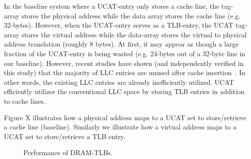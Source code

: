 In the baseline system where a UCAT-entry only stores a cache line,
the tag-array stores the physical address while the data array stores
the cache line (e.g. 32-bytes). However, when the UCAT-entry serves as
a TLB-entry, the UCAT tag-array stores the virtual address while the
data-array stores the virtual to physical address translation (roughly
8 bytes). At first, it may appear as though a large fraction of the
UCAT-entry is being wasted (e.g. 24-bytes out of a 32-byte line in our
baseline). However, recent studies have shown (and independently
verified in this study) that the majority of LLC entries are unused
after cache insertion~\cite{}. In other words, the existing LLC
entries are already inefficiently utilized. UCAT efficiently utilizes
the conventional LLC space by storing TLB entries in addition to cache
lines.

Figure X illustrates how a physical address maps to a UCAT set to
store/retrieve a cache line (baseline). Similarly we illustrate how a
virtual address maps to a UCAT set to store/retrieve a TLB entry.

% 
% 

\begin{figure}[tp] 
  \vspace{-0.in} \centering
  \centerline{}

  \caption{\small Performance of DRAM-TLBs. \normalsize}
  \label{fig:perf_UCAT} 
  \vspace{0.2 in}
\end{figure}


